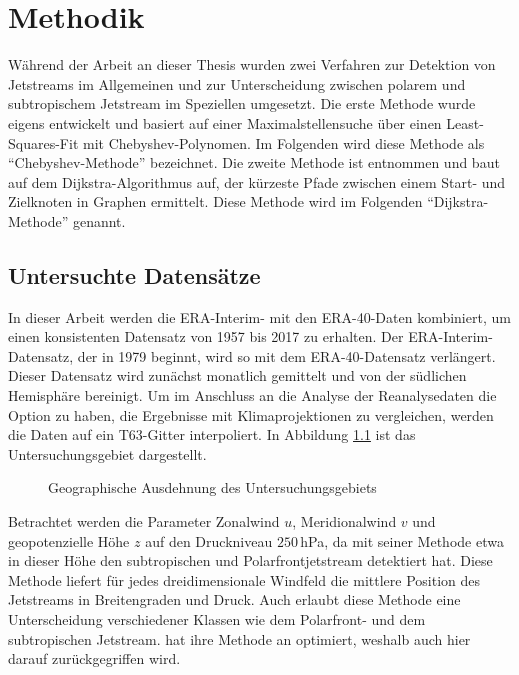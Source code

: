 \chapter{Methodik} \label{ch:methodik}
Während der Arbeit an dieser Thesis wurden zwei Verfahren zur Detektion von Jetstreams im Allgemeinen und zur Unterscheidung zwischen polarem und subtropischem Jetstream im Speziellen umgesetzt. Die erste Methode wurde eigens entwickelt und basiert auf einer Maximalstellensuche über einen Least-Squares-Fit mit Chebyshev-Polynomen. Im Folgenden wird diese Methode als \enquote{Chebyshev-Methode} bezeichnet. Die zweite Methode ist \citet{molnos-2017} entnommen und baut auf dem Dijkstra-Algorithmus auf, der kürzeste Pfade zwischen einem Start- und Zielknoten in Graphen ermittelt. Diese Methode wird im Folgenden \enquote{Dijkstra-Methode} genannt. 

\section{Untersuchte Datensätze}
In dieser Arbeit werden die ERA-Interim- \citep{dee-2011} mit den ERA-40-Daten \citep{uppala-2005} kombiniert, um einen konsistenten Datensatz von 1957 bis 2017 zu erhalten. Der ERA-Interim-Datensatz, der in 1979 beginnt, wird so mit dem ERA-40-Datensatz verlängert. Dieser Datensatz wird zunächst monatlich gemittelt und von der südlichen Hemisphäre bereinigt. Um im Anschluss an die Analyse der Reanalysedaten die Option zu haben, die Ergebnisse mit Klimaprojektionen zu vergleichen, werden die Daten auf ein T63-Gitter interpoliert. In Abbildung \ref{fig:area} ist das Untersuchungsgebiet dargestellt.

\begin{figure}[hbt]
  \centering
  \caption{Geographische Ausdehnung des Untersuchungsgebiets} \label{fig:area}
\end{figure}

Betrachtet werden die Parameter Zonalwind $u$, Meridionalwind $v$ und geopotenzielle Höhe $z$ auf den Druckniveau $250\,$hPa, da \citet{rikus-2015} mit seiner Methode etwa in dieser Höhe den subtropischen und Polarfrontjetstream detektiert hat. Diese Methode liefert für jedes dreidimensionale Windfeld die mittlere Position des Jetstreams in Breitengraden und Druck. Auch erlaubt diese Methode eine Unterscheidung verschiedener Klassen wie dem Polarfront- und dem subtropischen Jetstream. \citet{molnos-2017} hat ihre Methode an \citet{rikus-2015} optimiert, weshalb auch hier darauf zurückgegriffen wird.

